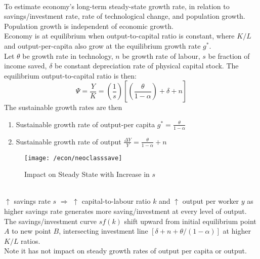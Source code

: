 \begin{definition} \\
To estimate economy's long-term steady-state growth rate, in relation to savings/investment rate, rate of technological change, and population growth. Population growth is independent of economic growth.\\
Economy is at equilibrium when output-to-capital ratio is constant, where $K/L$ and output-per-capita also grow at the equilibrium growth rate $g^{*}$.\\
Let $\theta$ be growth rate in technology, $n$ be growth rate of labour, $s$ be fraction of income saved, $\delta$ be constant depreciation rate of physical capital stock. The equilibrium output-to-capital ratio is then:
\begin{equation}
\Psi = \frac{Y}{K} = \left(\frac{1}{s} \right) \left[ \left( \frac{\theta}{1-\alpha} \right) + \delta + n \right] \nonumber
\end{equation}
The sustainable growth rates are then
\begin{enumerate}[label=\roman*.]
\setlength{\itemsep}{0pt}
\item Sustainable growth rate of output-per capita $g^* = \frac{\theta}{1-\alpha}$
\item Sustainable growth rate of output $\frac{\Delta Y}{Y} = \frac{\theta}{1-\alpha} + n$
\end{enumerate}
\end{definition}

\begin{figure}[H]
\centering
\texttt{[image: /econ/neoclasssave]}
\caption{Impact on Steady State with Increase in $s$}
\end{figure}

\begin{remark} \\
$\uparrow$ savings rate $s$ $\Rightarrow$ $\uparrow$ capital-to-labour ratio $k$ and $\uparrow$ output per worker $y$ as higher savings rate generates more saving/investment at every level of output.\\
The savings/investment curve $sf(k)$ shift upward from initial equilibrium point $A$ to new point $B$, intersecting investment line $[\delta + n + \theta/(1-\alpha)]$ at higher $K/L$ ratios.\\
Note it has not impact on steady growth rates of output per capita or output.
\end{remark}

